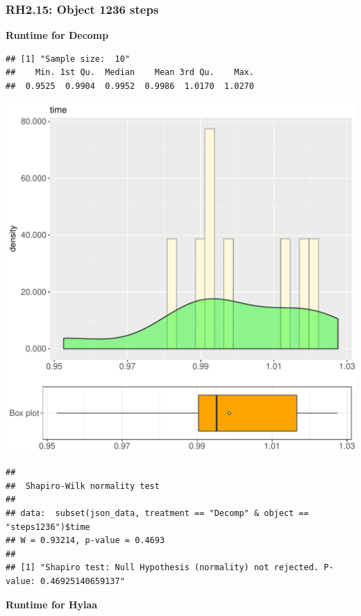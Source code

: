 \documentclass{article}\usepackage[]{graphicx}\usepackage[]{color}
\makeatletter
\def\maxwidth{ %
  \ifdim\Gin@nat@width>\linewidth
    \linewidth
  \else
    \Gin@nat@width
  \fi
}
\newenvironment{kframe}{%
 \def\at@end@of@kframe{}%
 \ifinner\ifhmode%
  \def\at@end@of@kframe{\end{minipage}}%
  \begin{minipage}{\columnwidth}%
 \fi\fi%
 \def\FrameCommand##1{\hskip\@totalleftmargin \hskip-\fboxsep
 \colorbox{shadecolor}{##1}\hskip-\fboxsep
     \hskip-\linewidth \hskip-\@totalleftmargin \hskip\columnwidth}%
 \MakeFramed {\advance\hsize-\width
   \@totalleftmargin\z@ \linewidth\hsize
   \@setminipage}}%
 {\par\unskip\endMakeFramed%
 \at@end@of@kframe}
\newenvironment{knitrout}{}{} %
\makeatother
\begin{document}
\subsubsection{RH2.15: Object 1236 steps}

 \textbf{Runtime for Decomp}
\begin{knitrout}
\color{fgcolor}\begin{kframe}
\begin{verbatim}
## [1] "Sample size:  10"
##    Min. 1st Qu.  Median    Mean 3rd Qu.    Max. 
##  0.9525  0.9904  0.9952  0.9986  1.0170  1.0270
\end{verbatim}
\end{kframe}
\includegraphics[width=\maxwidth]{figure/RH2_Decomp_steps1236-1} 
\begin{kframe}\begin{verbatim}
## 
## 	Shapiro-Wilk normality test
## 
## data:  subset(json_data, treatment == "Decomp" & object == "steps1236")$time
## W = 0.93214, p-value = 0.4693
## 
## [1] "Shapiro test: Null Hypothesis (normality) not rejected. P-value: 0.46925140659137"
\end{verbatim}
\end{kframe}
\end{knitrout}
 \textbf{Runtime for Hylaa}
\end{document}
